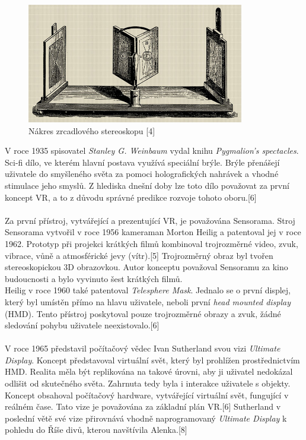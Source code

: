 \documentclass[a4paper, 12pt]{report}
\begin{document}
\begin{figure}[h!]
	\centering
	\includegraphics[width=9.5cm]{Wheatstoneův_zrcadlový_stereoskop.jpg}
	\caption{Nákres zrcadlového stereoskopu [4]}
\end{figure}

V roce 1935 spisovatel \textit{Stanley G. Weinbaum} vydal knihu \textit{Pygmalion's spectacles}. Sci-fi dílo, ve kterém hlavní postava využívá speciální brýle. Brýle přenášejí uživatele do smyšleného světa za pomoci holografických nahrávek a vhodné stimulace jeho smyslů. Z hlediska dnešní doby lze toto dílo považovat za první koncept VR, a to z důvodu správné predikce rozvoje tohoto oboru.[6]\\
\\
Za první přístroj, vytvářející a prezentující VR, je považována Sensorama. Stroj Sensorama vytvořil v roce 1956 kameraman Morton Heilig a patentoval jej v roce 1962. Prototyp při projekci krátkých filmů kombinoval trojrozměrné video, zvuk, vibrace, vůně a atmosférické jevy (vítr).[5] Trojrozměrný obraz byl tvořen stereoskopickou 3D obrazovkou. Autor konceptu považoval Sensoramu za kino budoucnosti a bylo vyvinuto šest krátkých filmů.\\
Heilig v roce 1960 také patentoval \textit{Telesphere Mask}. Jednalo se o první displej, který byl umístěn přímo na hlavu uživatele, neboli první \textit{head mounted display} (HMD). Tento přístroj poskytoval pouze trojrozměrné obrazy a zvuk, žádné sledování pohybu uživatele neexistovalo.[6]\\
\\
V roce 1965 představil počítačový vědec Ivan Sutherland svou vizi \textit{Ultimate Display}. Koncept představoval virtuální svět, který byl prohlížen prostřednictvím HMD. Realita měla být replikována na takové úrovni, aby ji uživatel nedokázal odlišit od skutečného světa. Zahrnuta tedy byla i interakce uživatele s objekty. Koncept obsahoval počítačový hardware, vytvářející virtuální svět, fungující v reálném čase. Tato vize je považována za základní plán VR.[6] Sutherland v poslední větě své vize přirovnává vhodně naprogramovaný \textit{Ultimate Display} k pohledu do Říše divů, kterou navštívila Alenka.[8]\\
\end{document}
